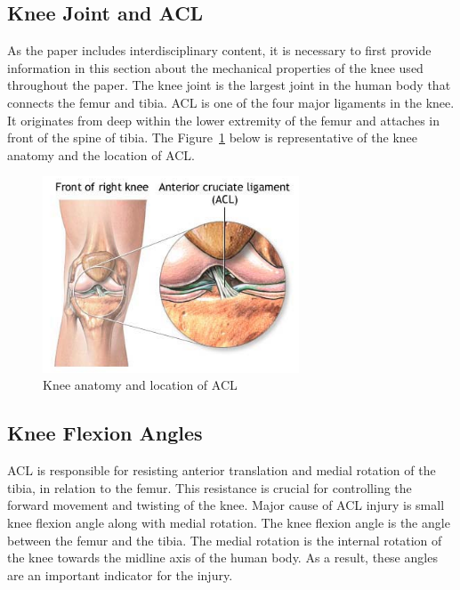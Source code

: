 \subsection{Knee Joint and ACL} 
As the paper includes interdisciplinary content, it is necessary to first provide information in this section about the mechanical properties of the knee used throughout the paper. The knee joint is the largest joint in the human body that connects the femur and tibia. ACL is one of the four major ligaments in the knee. It originates from deep within the lower extremity of the femur and attaches in front of the spine of tibia. The Figure~\ref{fig:knee_anatomy} below is representative of the knee anatomy and the location of ACL. 

\begin{figure}[h]
  \begin{center}
    \includegraphics[width=3in]{images/acl_anatomy.png}
  \end{center}
  \caption{Knee anatomy and location of ACL}
  \label{fig:knee_anatomy}
\end{figure}

\subsection{Knee Flexion Angles}
ACL is responsible for resisting anterior translation and medial rotation of the tibia, in relation to the femur. This resistance is crucial for controlling the forward movement and twisting of the knee. Major cause of ACL injury is small knee flexion angle along with medial rotation. The knee flexion angle is the angle between the femur and the tibia. The medial rotation is the internal rotation of the knee towards the midline axis of the human body. As a result, these angles are an important indicator for the injury.

